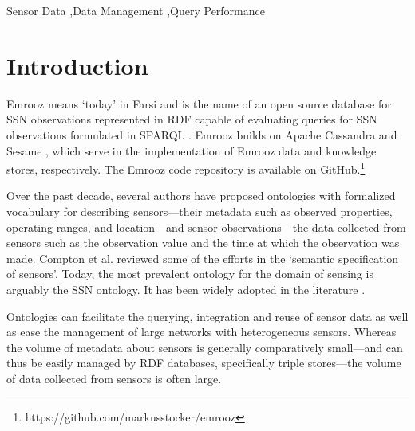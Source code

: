 \documentclass[preprint,12pt,authoryear]{elsarticle}
\begin{document}
\begin{frontmatter}
\begin{keyword}
Sensor Data \sep Data Management \sep Query Performance



\end{keyword}

\end{frontmatter}


\section{Introduction}
\label{s:introduction}
Emrooz means `today' in Farsi and is the name of an open source database for SSN \cite{compton12ssn} observations represented in RDF \cite{cyganiak14rdf} capable of evaluating queries for SSN observations formulated in SPARQL \cite{harris13sparql}. Emrooz builds on Apache Cassandra and Sesame \cite{broekstra02sesame}, which serve in the implementation of Emrooz data and knowledge stores, respectively. The Emrooz code repository is available on GitHub.\footnote{https://github.com/markusstocker/emrooz}

Over the past decade, several authors have proposed ontologies with formalized vocabulary for describing sensors---their metadata such as observed properties, operating ranges, and location---and sensor observations---the data collected from sensors such as the observation value and the time at which the observation was made. Compton et al. \cite{compton09sensors} reviewed some of the efforts in the `semantic specification of sensors'. Today, the most prevalent ontology for the domain of sensing is arguably the SSN ontology. It has been widely adopted in the literature \cite{lefort12qb,phuoc11linked,mueller13restful,calbimonte12deriving,yu14linked,wu12representing,llaves14event,taylor11ontology,rinne13event}.

Ontologies can facilitate the querying, integration and reuse of sensor data as well as ease the management of large networks with heterogeneous sensors. Whereas the volume of metadata about sensors is generally comparatively small---and can thus be easily managed by RDF databases, specifically triple stores---the volume of data collected from sensors is often large. 
\end{document}
